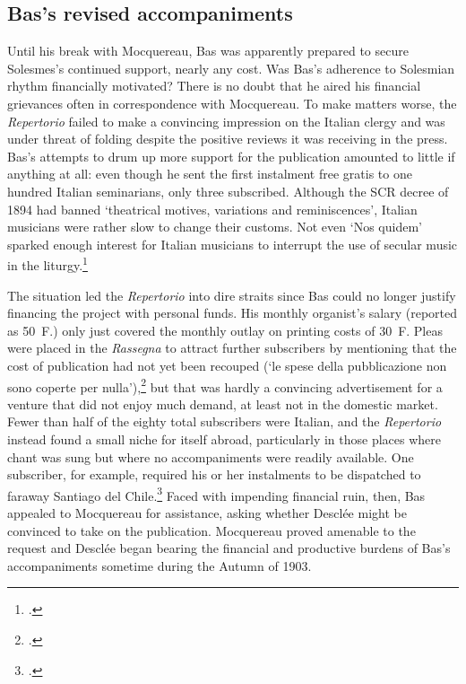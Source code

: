\subsection{Bas's revised accompaniments}
Until his break with Mocquereau, Bas was apparently prepared to secure Solesmes's continued support, nearly any cost.
Was Bas's adherence to Solesmian rhythm financially motivated?
There is no doubt that he aired his financial grievances often in correspondence with Mocquereau.
To make matters worse, the \emph{Repertorio} failed to make a convincing impression on the Italian clergy and was under threat of folding despite the positive reviews it was receiving in the press.
Bas's attempts to drum up more support for the publication amounted to little if anything at all: even though he sent the first instalment free gratis to one hundred Italian seminarians, only three subscribed.
Although the SCR decree of 1894 had banned `theatrical motives, variations and reminiscences', Italian musicians were rather slow to change their customs.
Not even `Nos quidem' sparked enough interest for Italian musicians to interrupt the use of secular music in the liturgy.\footcites[141]{HayburnPapalLegislationSacred1979}[27--8]{JaschinskiRenewalCatholicChurch2010}

The situation led the \emph{Repertorio} into dire straits since Bas could no longer justify financing the project with personal funds.
His monthly organist's salary (reported as 50~F.) only just covered the monthly outlay on printing costs of 30~F.
Pleas were placed in the \emph{Rassegna} to attract further subscribers by mentioning that the cost of publication had not yet been recouped (`le spese della pubblicazione non sono coperte per nulla'),\footcite[cols 319--20]{R.RepertoriodiMelodie1903} but that was hardly a convincing advertisement for a venture that did not enjoy much demand, at least not in the domestic market.
Fewer than half of the eighty total subscribers were Italian, and the \emph{Repertorio} instead found a small niche for itself abroad, particularly in those places where chant was sung but where no accompaniments were readily available.
One subscriber, for example, required his or her instalments to be dispatched to faraway Santiago del Chile.\footcite[col.~375--6]{MonteroAmericaLatinaSantiago1903}
Faced with impending financial ruin, then, Bas appealed to Mocquereau for assistance, asking whether Desclée might be convinced to take on the publication.
Mocquereau proved amenable to the request and Desclée began bearing the financial and productive burdens of Bas's accompaniments sometime during the Autumn of 1903.

